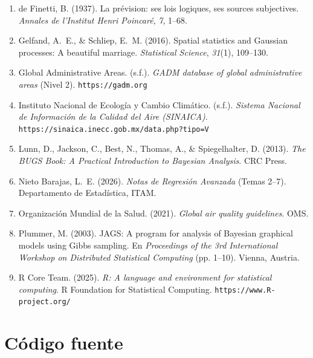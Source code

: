 \documentclass[12pt]{article}
\begin{document}
\begin{enumerate}
  \item de Finetti, B. (1937).
        La pr\'evision: ses lois logiques, ses sources subjectives.
        \textit{Annales de l'Institut Henri Poincar\'e}, \textit{7}, 1--68.

  \item Gelfand, A.~E., \& Schliep, E.~M. (2016).
        Spatial statistics and Gaussian processes: A beautiful marriage.
        \textit{Statistical Science}, \textit{31}(1), 109--130.

  \item Global Administrative Areas. (s.f.).
        \textit{GADM database of global administrative areas} (Nivel 2).
        \texttt{https://gadm.org}

  \item Instituto Nacional de Ecolog\'ia y Cambio Clim\'atico. (s.f.).
        \textit{Sistema Nacional de Informaci\'on de la Calidad del Aire (SINAICA)}.
        \texttt{https://sinaica.inecc.gob.mx/data.php?tipo=V}

  \item Lunn, D., Jackson, C., Best, N., Thomas, A., \& Spiegelhalter, D. (2013).
        \textit{The BUGS Book: A Practical Introduction to Bayesian Analysis}.
        CRC Press.

  \item Nieto Barajas, L.~E. (2026).
        \textit{Notas de Regresi\'on Avanzada} (Temas 2--7).
        Departamento de Estad\'istica, ITAM.

  \item Organizaci\'on Mundial de la Salud. (2021).
        \textit{Global air quality guidelines}.
        OMS.

  \item Plummer, M. (2003).
        JAGS: A program for analysis of Bayesian graphical models using Gibbs
        sampling.
        En \textit{Proceedings of the 3rd International Workshop on Distributed
        Statistical Computing} (pp. 1--10). Vienna, Austria.

  \item R Core Team. (2025).
        \textit{R: A language and environment for statistical computing}.
        R Foundation for Statistical Computing.
        \texttt{https://www.R-project.org/}
\end{enumerate}


\appendix
\section{C\'odigo fuente}
\end{document}
